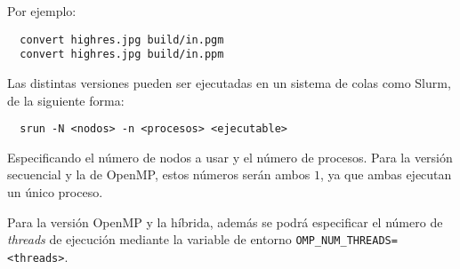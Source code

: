 \noindent
Por ejemplo:
\begin{verbatim}
  convert highres.jpg build/in.pgm
  convert highres.jpg build/in.ppm
\end{verbatim}


Las distintas versiones pueden ser ejecutadas en un sistema de colas como Slurm, de la siguiente forma:
\begin{verbatim}
  srun -N <nodos> -n <procesos> <ejecutable>
\end{verbatim}

Especificando el número de nodos a usar y el número de procesos. Para la versión secuencial y la de OpenMP, estos números serán ambos $1$, ya que ambas ejecutan un único proceso.

Para la versión OpenMP y la híbrida, además se podrá especificar el número de \textit{threads} de ejecución mediante la variable de entorno \texttt{OMP\_NUM\_THREADS=<threads>}.